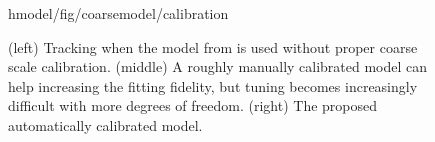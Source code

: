 \begin{figure}[b!]
\centering
\begin{overpic} 
[width=\linewidth]
{hmodel/fig/coarsemodel/calibration}
\end{overpic}
\vspace{-.25in}
\caption{
% 
% 
(left) Tracking when the model from \protect\cite{tagliasacchi2015robust} is used without proper coarse scale calibration. (middle) A roughly manually calibrated model can help increasing the fitting fidelity, but tuning becomes increasingly difficult with more degrees of freedom. (right) The proposed automatically calibrated model. 
% 
% 
}
\label{fig:coarsemodel}
\end{figure}